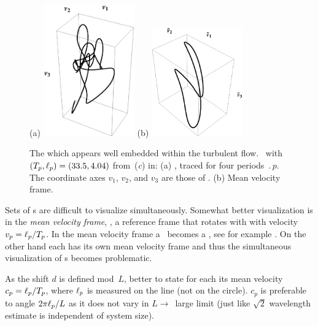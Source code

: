 %


\begin{figure}[t]
\begin{center}
(a) \includegraphics[width=0.35\textwidth]{figs/ks22rpo033.50_04.045E2.eps}
(b) \includegraphics[width=0.35\textwidth]{figs/ks22rpo033.50_04.045E2CM.eps}
\\
\end{center}
\caption{
 The
which appears well embedded within the turbulent flow. 
\rpo\ with $({T_{p}},\ell_p) =(33.5,4.04)$
from \,(\textit{c}) in:
 (a) \Statesp, traced for four periods $\period{p}$. The coordinate axes
$v_1$, $v_2$, and $v_3$ are those of .
 (b) Mean velocity frame.
        } \label{f:MeanVelocityFrame}
\end{figure}



Sets of \rpo s are difficult to visualize simultaneously.
Somewhat better visualization is in the
{\em mean velocity frame}, {\ie},
a reference frame that rotates with with velocity
$v_p=\ell_p/{T_{p}}$.
In the mean velocity frame a \rpo\ becomes
a \po, see  for example .
On the other hand each {\rpo} has its own mean velocity frame and thus
the simultaneous visualization of \rpo s becomes problematic.

As the shift $d$ is defined mod~$L$, better to
state for each {\rpo} its mean velocity $c_p = \ell_p/{T_{p}}$,
where $\ell_p$ is measured on the line (not on the circle). $c_p$ is
preferable to angle $2\pi \ell_p/L$ as it does not vary in $L \to$~large
limit (just like $\sqrt{2}$ wavelength estimate is independent of
system size).
